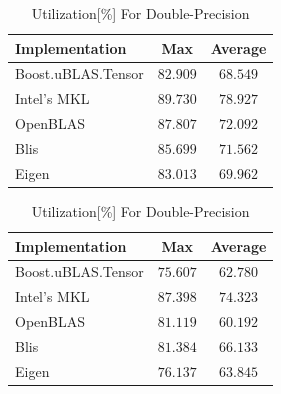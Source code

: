 \begin{table}[ht]
    \centering
    \caption{Utilization[\%] For Single-Precision}
    \begin{tabular}{|l|c|c|}
        \hline
        \textbf{Implementation} & \textbf{Max} & \textbf{Average}\\
        \hline
        Boost.uBLAS.Tensor  & $82.909$ & $68.549$ \\
        \hline
        Intel's MKL         & $89.730$ & $78.927$ \\
        \hline
        OpenBLAS            & $87.807$ & $72.092$ \\
        \hline
        Blis                & $85.699$ & $71.562$ \\
        \hline
        Eigen               & $83.013$ & $69.962$ \\
        \hline
    \end{tabular}

    \vspace*{1 cm}

    \centering
    \caption{Utilization[\%] For Double-Precision}
    \begin{tabular}{|l|c|c|}
        \hline
        \textbf{Implementation} & \textbf{Max} & \textbf{Average}\\
        \hline
        Boost.uBLAS.Tensor  & $75.607$ & $62.780$ \\
        \hline
        Intel's MKL         & $87.398$ & $74.323$ \\
        \hline
        OpenBLAS            & $81.119$ & $60.192$ \\
        \hline
        Blis                & $81.384$ & $66.133$ \\
        \hline
        Eigen               & $76.137$ & $63.845$ \\
        \hline
    \end{tabular}
\end{table}

